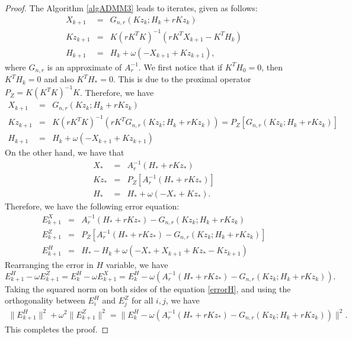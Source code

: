 \begin{proof} 
The Algorithm \ref{algADMM3} leads to iterates, given as follows: 
\begin{eqnarray*}
X_{k+1} &=& G_{n,r} (Kz_k;H_k + r K z_k) \\
Kz_{k+1} &=& K(rK^TK)^{-1} (rK^T X_{k+1} - K^TH_k) \\ 
H_{k+1} &=& H_k + \omega (-X_{k+1} + Kz_{k+1} ), 
\end{eqnarray*}
where $G_{n,r}$ is an approximate of $A_r^{-1}$. We first notice that if $K^TH_0 = 0$, then $K^TH_k = 0$ and also $K^TH_* = 0$. This is due to the proximal operator $P_Z = K(K^TK)^{-1}K$. Therefore, we have 
\begin{eqnarray*}
X_{k+1} &=& G_{n,r} (Kz_k; H_k + r K z_k) \\
Kz_{k+1} &=& K(rK^TK)^{-1} (rK^T G_{n,r} (Kz_k;H_k + r K z_k)) = P_Z [G_{n,r} (Kz_k; H_k + r K z_k)]  \\ 
H_{k+1} &=& H_k + \omega (-X_{k+1} + Kz_{k+1} )
\end{eqnarray*}
On the other hand, we have that 
\begin{eqnarray*}
X_{*} &=& A_r^{-1} (H_* + r K z_*) \\
Kz_{*} &=& P_Z [A_r^{-1}(H_* + rK z_*)] \\ 
H_{*} &=& H_* + \omega (-X_{*} + K z_{*}). 
\end{eqnarray*}
Therefore, we have the following error equation: 
\begin{eqnarray*}
E_{k+1}^X &=& A_r^{-1} (H_* + r K z_*) - G_{n,r} (Kz_k; H_k + r K z_k) \\
E_{k+1}^Z &=& P_Z [ A_r^{-1} (H_* + rK z_*) - G_{n,r}(Kz_k; H_k + rK z_k) ] \\
E_{k+1}^H &=& H_* - H_k + \omega (-X_* + X_{k+1} + Kz_{*} - K z_{k+1})
\end{eqnarray*}
Rearranging the error in $H$ variable, we have 
\begin{equation}\label{errorHx}
E_{k+1}^H - \omega E_{k+1}^Z = E_k^H - \omega E_{k+1}^X = E_k^H - \omega \left( A_r^{-1} (H_* + r K z_*) - G_{n,r}(Kz_k; H_k + r K z_k) \right).    
\end{equation}
Taking the squared norm on both sides of the equation \eqref{errorH}, and using the orthogonality between $E_i^H$ and $E_j^Z$ for all $i,j$, we have 
\begin{eqnarray*}
\|E_{k+1}^H\|^2 + \omega^2 \|E_{k+1}^Z\|^2 = \|E_k^H - \omega (A_r^{-1} (H_* + r K z_*) - G_{n,r} (Kz_k; H_k + r K z_k))\|^2. 
\end{eqnarray*}
This completes the proof. 


\end{proof}

